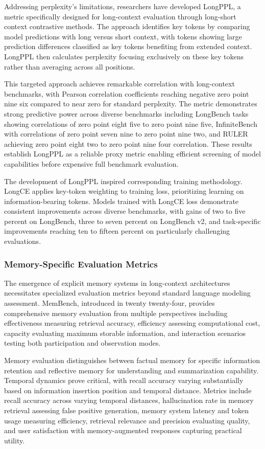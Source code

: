 Addressing perplexity's limitations, researchers have developed LongPPL, a metric specifically designed for long-context evaluation through long-short context contrastive methods. The approach identifies key tokens by comparing model predictions with long versus short context, with tokens showing large prediction differences classified as key tokens benefiting from extended context. LongPPL then calculates perplexity focusing exclusively on these key tokens rather than averaging across all positions.

This targeted approach achieves remarkable correlation with long-context benchmarks, with Pearson correlation coefficients reaching negative zero point nine six compared to near zero for standard perplexity. The metric demonstrates strong predictive power across diverse benchmarks including LongBench tasks showing correlations of zero point eight five to zero point nine five, InfiniteBench with correlations of zero point seven nine to zero point nine two, and RULER achieving zero point eight two to zero point nine four correlation. These results establish LongPPL as a reliable proxy metric enabling efficient screening of model capabilities before expensive full benchmark evaluation.

The development of LongPPL inspired corresponding training methodology. LongCE applies key-token weighting to training loss, prioritizing learning on information-bearing tokens. Models trained with LongCE loss demonstrate consistent improvements across diverse benchmarks, with gains of two to five percent on LongBench, three to seven percent on LongBench v2, and task-specific improvements reaching ten to fifteen percent on particularly challenging evaluations.

\subsubsection{Memory-Specific Evaluation Metrics}

The emergence of explicit memory systems in long-context architectures necessitates specialized evaluation metrics beyond standard language modeling assessment. MemBench, introduced in twenty twenty-four, provides comprehensive memory evaluation from multiple perspectives including effectiveness measuring retrieval accuracy, efficiency assessing computational cost, capacity evaluating maximum storable information, and interaction scenarios testing both participation and observation modes.

Memory evaluation distinguishes between factual memory for specific information retention and reflective memory for understanding and summarization capability. Temporal dynamics prove critical, with recall accuracy varying substantially based on information insertion position and temporal distance. Metrics include recall accuracy across varying temporal distances, hallucination rate in memory retrieval assessing false positive generation, memory system latency and token usage measuring efficiency, retrieval relevance and precision evaluating quality, and user satisfaction with memory-augmented responses capturing practical utility.

